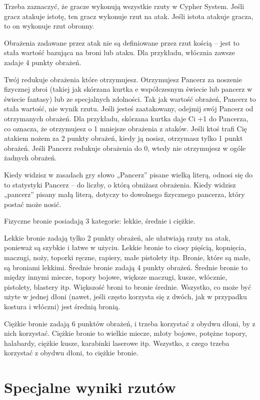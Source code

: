 Trzeba zaznaczyć, że gracze wykonują wszystkie rzuty w Cypher System. Jeśli gracz atakuje istotę, ten gracz wykonuje rzut na atak. Jeśli istota atakuje gracza, to on wykonuje rzut obronny. 

Obrażenia zadawane przez atak nie są definiowane przez rzut kością – jest to stała wartość bazująca na broni lub ataku. Dla przykładu, włócznia zawsze zadaje 4 punkty obrażeń.

Twój  redukuje obrażenia które otrzymujesz. Otrzymujesz Pancerz za noszenie fizycznej zbroi (takiej jak skórzana kurtka e współczesnym świecie lub pancerz w świecie fantasy) lub ze specjalnych zdolności. Tak jak wartość obrażeń, Pancerz to stała wartość, nie wynik rzutu. Jeśli jesteś zaatakowany, odejmij swój Pancerz od otrzymanych obrażeń. Dla przykładu, skórzana kurtka daje Ci +1 do Pancerza, co oznacza, że otrzymujesz o 1 mniejsze obrażenia z ataków. Jeśli ktoś trafi Cię atakiem nożem za 2 punkty obrażeń, kiedy ją nosisz, otrzymasz tylko 1 punkt obrażeń. Jeśli Pancerz redukuje obrażenia do 0, wtedy nie otrzymujesz w ogóle żadnych obrażeń. 

Kiedy widzisz w zasadach gry słowo „Pancerz” pisane wielką literą, odnosi się do to statystyki Pancerz – do liczby, o którą obniżasz obrażenia. Kiedy widzisz „pancerz” pisany małą literą, dotyczy to dowolnego fizycznego pancerza, który postać może nosić. 

Fizyczne bronie posiadają 3 kategorie: lekkie, średnie i ciężkie.  

Lekkie bronie zadają tylko 2 punkty obrażeń, ale ułatwiają rzuty na atak, ponieważ są szybkie i łatwe w użyciu. Lekkie bronie to ciosy pięścią, kopnięcia, maczugi, noży, toporki ręczne, rapiery, małe pistolety itp. Bronie, które są małe, są broniami lekkimi.
Średnie bronie zadają 4 punkty obrażeń. Średnie bronie to między innymi miecze, topory bojowe, większe maczugi, kusze, włócznie, pistolety, blastery itp. Większość broni to bronie średnie. Wszystko, co może być użyte w jednej dłoni (nawet, jeśli często korzysta się z dwóch, jak w przypadku kostura i włóczni) jest średnią bronią. 

Ciężkie bronie zadają 6 punktów obrażeń, i trzeba korzystać z obydwu dłoni, by z nich korzystać. Ciężkie bronie to wielkie miecze, młoty bojowe, potężne topory, halabardy, ciężkie kusze, karabinki laserowe itp. Wszystko, z czego trzeba korzystać z obydwu dłoni, to ciężkie bronie.

\section {Specjalne wyniki rzutów}


